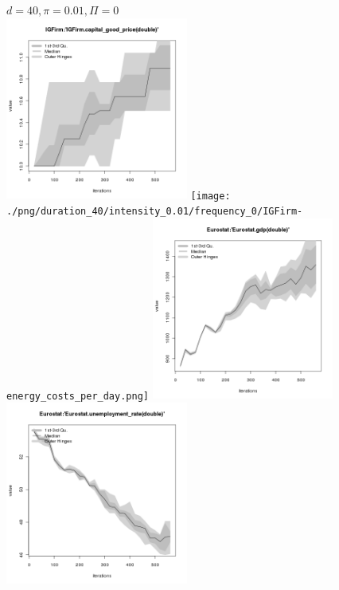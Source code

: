 \begin{figure}[ht!]
\centering\leavevmode
\begin{minipage}{13cm}
\centering\leavevmode
{$d=40, \pi=0.01, \Pi=0$}\\
\includegraphics[width=6cm]{./png/duration_40/intensity_0.01/frequency_0/IGFirm-capital_good_price.png}
\texttt{[image: ./png/duration\_40/intensity\_0.01/frequency\_0/IGFirm-energy\_costs\_per\_day.png]}
\includegraphics[width=6cm]{./png/duration_40/intensity_0.01/frequency_0/Eurostat-gdp.png}
\includegraphics[width=6cm]{./png/duration_40/intensity_0.01/frequency_0/Eurostat-unemployment_rate.png}
\end{minipage}
\end{figure}

